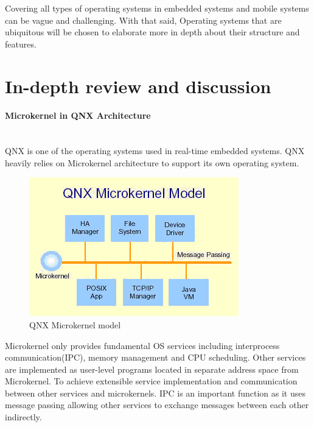 \documentclass[conference]{IEEEtran}
\newcommand{\forceindent}{\leavevmode{\parindent=1em\indent}}
\begin{document}
\smallskip
\forceindent Covering all types of operating systems in embedded systems and mobile systems can be vague and challenging. With that said, Operating  systems  that are ubiquitous will be chosen to elaborate more in depth about their structure and features.


\bigskip
\section{In-depth review and discussion}


\paragraph{Microkernel in QNX Architecture} \mbox{} \\
\forceindent QNX is one of the operating systems used in real-time embedded systems. QNX heavily relies on Microkernel architecture to support its own operating system\cite{Burger}\cite{Galvinbook}.


\begin{figure}[h]
\caption{QNX Microkernel model}
\begin{center}
\includegraphics[scale=0.6]{./images/QNX_microkernel_mode.png}
\end{center}
\end{figure}

\forceindent Microkernel only provides fundamental OS services including interprocess communication(IPC), memory management and CPU scheduling\cite{Galvinbook}. Other services are implemented as user-level programs located in separate address space from Microkernel\cite{Galvinbook}. To achieve extensible service implementation and communication between other services and microkernels. IPC is an important function as it uses message passing\cite{Burger} allowing other services to exchange messages between each other indirectly.
\end{document}
